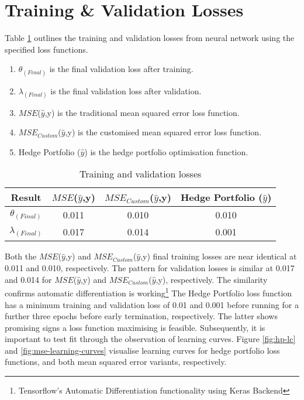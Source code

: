 \documentclass[12pt]{article}
\begin{document}
\section{Training \& Validation Losses}
Table \ref{train-val-losses} outlines the training and validation losses from neural network using the specified loss functions.
\begin{table}[H]
	\small
	\singlespacing
	\begin{enumerate}
	\item $\theta_{(Final)}$ is the final validation loss after training. 
    \item $\lambda_{(Final)}$ is the final validation loss after validation.
	\item $MSE$($\hat{y}$,y) is the traditional mean squared error loss function.
    \item $MSE_{Custom}$($\hat{y}$,y) is the customised mean squared error loss function.
	\item Hedge Portfolio ($\hat{y}$) is the hedge portfolio optimisation function.
	\end{enumerate}
	\doublespacing
	\centering
    \begin{tabular}{||c||c||c||c||}
        \hline
        Result & $MSE$($\hat{y}$,y) & $MSE_{Custom}$($\hat{y}$,y) & Hedge Portfolio ($\hat{y}$)\\ [0.5ex]
        \hline \hline
        $\theta_{(Final)}$ &0.011 & 0.010 & 0.010\\
        \hline
        $\lambda_{(Final)}$ & 0.017 & 0.014& 0.001\\
		\hline
    \end{tabular}
    \caption{Training and validation losses}
    \label{train-val-losses}
\end{table}
Both the $MSE$($\hat{y}$,y) and $MSE_{Custom}$($\hat{y}$,y) final training losses are near identical at 0.011 and 0.010, respectively.
The pattern for validation losses is similar at 0.017 and 0.014 for $MSE$($\hat{y}$,y) and $MSE_{Custom}$($\hat{y}$,y), respectively.
The similarity confirms automatic differentiation is working\footnote{Tensorflow's Automatic Differentiation functionality using Keras Backend}
The Hedge Portfolio loss function has a minimum training and validation loss of 0.01 and 0.001 before running for a further three epochs before early termination, respectively.
The latter shows promising signs a loss function maximising is feasible. 
Subsequently, it is important to test fit through the observation of learning curves.
Figure \ref{fig:hp-lc} and \ref{fig:mse-learning-curves} visualise learning curves for hedge portfolio loss functions, and both mean squared error variants, respectively.
\end{document}
